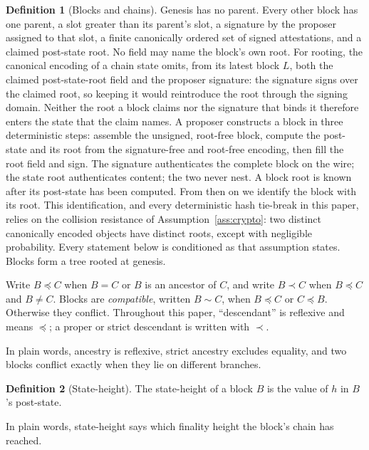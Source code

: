 \ifx\litemode\undefined\documentclass{article}\fi
\theoremstyle{plain}
\theoremstyle{definition}
\newtheorem{definition}{Definition}
\theoremstyle{remark}
\begin{document}
\begin{definition}[Blocks and chains]\label{def:block-chain}
Genesis has no parent.  Every other block has one parent, a slot
greater than its parent's slot, a signature by the proposer assigned to that
slot, a finite canonically ordered set of signed attestations, and a claimed
post-state root.
No field may name the block's own root.  For rooting, the canonical
encoding of a chain state omits, from its
latest block \(L\), both the claimed post-state-root field and the
proposer signature: the signature signs over the claimed root, so
keeping it would reintroduce the root through the signing domain.
Neither the root a block claims nor the signature that binds it
therefore enters the state that the claim names.  A proposer constructs
a block in three deterministic steps: assemble the unsigned,
root-free block, compute the post-state and its root from the
signature-free and root-free encoding, then fill the root field and
sign.  The signature authenticates the complete block on the wire; the
state root authenticates content; the two never nest.  A block root is known after its
post-state has been computed.  From then on we identify the block with its
root.  This identification, and every deterministic hash tie-break in this
paper, relies on the collision resistance of
Assumption~\ref{ass:crypto}: two distinct canonically encoded objects
have distinct roots, except with negligible probability.  Every
statement below is conditioned as that assumption states.
Blocks form a tree rooted at genesis.

Write \(B\preceq C\) when \(B=C\) or \(B\) is an ancestor of \(C\), and write
\(B\prec C\) when \(B\preceq C\) and \(B\neq C\).  Blocks are
\emph{compatible}, written \(B\sim C\), when \(B\preceq C\) or
\(C\preceq B\).  Otherwise they conflict.
Throughout this paper, ``descendant'' is reflexive and means
\(\preceq\); a proper or strict descendant is written with \(\prec\).

In plain words, ancestry is reflexive, strict ancestry excludes equality, and
two blocks conflict exactly when they lie on different branches.
\end{definition}

\begin{definition}[State-height]\label{def:state-height}
The state-height of a block \(B\) is the value of \(h\) in \(B\)'s post-state.

In plain words, state-height says which finality height the block's chain has
reached.
\end{definition}
\end{document}
